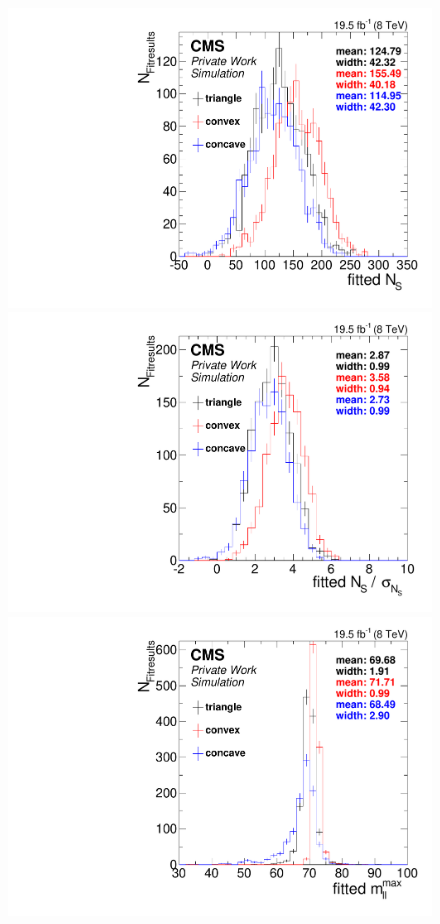 \begin{figure}[!hbp]
  \centering
  \begin{minipage}[t]{0.49\textwidth}
    \includegraphics[width=\textwidth]{plots/results/fit/toyResults/nSPure_shapeBias.pdf}
  \end{minipage}
  \begin{minipage}[t]{0.49\textwidth}
    \includegraphics[width=\textwidth]{plots/results/fit/toyResults/nS_shapeBias.pdf}
  \end{minipage}
  \begin{minipage}[t]{0.49\textwidth}
    \includegraphics[width=\textwidth]{plots/results/fit/toyResults/m0_shapeBias.pdf}

\end{minipage}
\end{figure}

